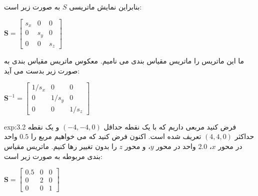 {\begin{spacing}{1.5}
        بنابراین نمایش ماتریسی $S$ به صورت زیر است:

        \begin{center}
            $\textbf{S}=\begin{bmatrix}
                            s_x & 0   & 0   \\
                            0   & s_y & 0   \\
                            0   & 0   & s_z
            \end{bmatrix}$
        \end{center}

        ما این ماتریس را ماتریس مقیاس بندی می نامیم.
        معکوس ماتریس مقیاس بندی به صورت زیر بدست می آید:

        \begin{center}
            $\textbf{S}^{-1}=\begin{bmatrix}
                                 1/s_x & 0     & 0     \\
                                 0     & 1/s_y & 0     \\
                                 0     & 0     & 1/s_z
            \end{bmatrix}$
        \end{center}

        \begin{example}{exp:3.2}
            \Large
            فرض کنید مربعی داریم که با یک نقطه حداقل $(-4,-4, 0)$ و یک نقطه حداکثر $(4,4,0)$ تعریف شده است.
            اکنون فرض کنید که می خواهیم مربع را $0.5$ واحد در محور $x$، $2.0$ واحد در محور $y$، و محور $z$ را بدون تغییر رها کنیم.
            ماتریس مقیاس بندی مربوطه به صورت زیر است:

            \begin{center}
                $\textbf{S}=\begin{bmatrix}
                                0.5 & 0 & 0 \\
                                0   & 2 & 0 \\
                                0   & 0 & 1
                \end{bmatrix}$
            \end{center}


\end{example}
\end{spacing}}
